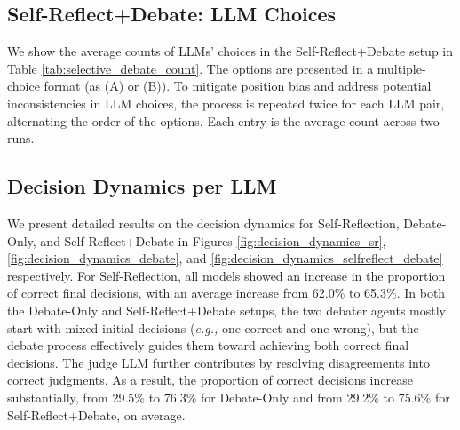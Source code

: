 \documentclass[11pt]{article}
\begin{document}




\subsection{Self-Reflect+Debate: LLM Choices}
\label{appendix:reflect_debate}
We show the average counts of LLMs' choices in the Self-Reflect+Debate setup in Table \ref{tab:selective_debate_count}. The options are presented in a multiple-choice format (as (A) or (B)). To mitigate position bias \cite{orderofoptions} and address potential inconsistencies in LLM choices, the process is repeated twice for each LLM pair, alternating the order of the options. Each entry is the average count across two runs.






\subsection{Decision Dynamics per LLM}
\label{appendix:detailed_dynamics}
We present detailed results on the decision dynamics for Self-Reflection, Debate-Only, and Self-Reflect+Debate in Figures \ref{fig:decision_dynamics_sr}, \ref{fig:decision_dynamics_debate}, and \ref{fig:decision_dynamics_selfreflect_debate} respectively. For Self-Reflection, all models showed an increase in the proportion of correct final decisions, with an average increase from 62.0\% to 65.3\%. In both the Debate-Only and Self-Reflect+Debate setups, the two debater agents mostly start with mixed initial decisions (\textit{e.g.,} one correct and one wrong), but the debate process effectively guides them toward achieving both correct final decisions. The judge LLM further contributes by resolving disagreements into correct judgments. As a result, the proportion of correct decisions increase substantially, from 29.5\% to 76.3\% for Debate-Only and from 29.2\% to 75.6\% for Self-Reflect+Debate, on average.


% 
% 
% 





\end{document}
